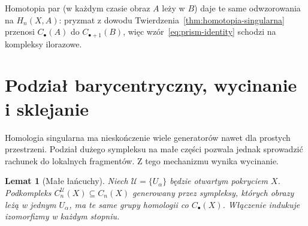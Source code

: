 \documentclass[11pt,a4paper,oneside]{report}
\theoremstyle{plain}
\newtheorem{lemat}[twierdzenie]{Lemat}
\theoremstyle{definition}
\theoremstyle{remark}
\begin{document}
Homotopia par (w każdym czasie obraz $A$
leży w $B$) daje te same odwzorowania na $H_n(X,A)$:
pryzmat z dowodu Twierdzenia~\ref{thm:homotopia-singularna}
przenosi $C_\bullet(A)$ do $C_{\bullet+1}(B)$,
więc wzór~\eqref{eq:prism-identity}
schodzi na kompleksy ilorazowe.

\section{Podział barycentryczny, wycinanie i sklejanie}
\label{sec:wycinanie-homologia}

Homologia singularna ma nieskończenie wiele generatorów nawet
dla prostych przestrzeni. Podział dużego sympleksu na małe
części pozwala jednak sprowadzić rachunek do lokalnych
fragmentów. Z tego mechanizmu wynika wycinanie.

\begin{lemat}[Małe łańcuchy]
\label{lem:male-lancuchy}
Niech $\mathcal U=\{U_\alpha\}$ będzie otwartym
pokryciem $X$. Podkompleks
$C_n^{\mathcal U}(X)\subseteq C_n(X)$
generowany przez sympleksy, których obrazy
leżą w jednym $U_\alpha$, ma te same
grupy homologii co $C_\bullet(X)$.
Włączenie indukuje izomorfizmy w każdym stopniu.
\end{lemat}
\end{document}
